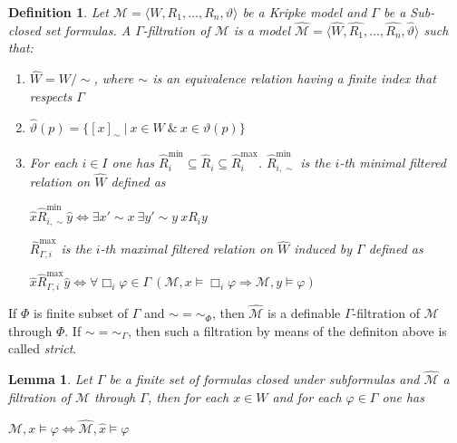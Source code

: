 \documentclass[a4paper]{article}
\theoremstyle{defin}
\newtheorem{defin}{Definition}
\theoremstyle{theorem}
\theoremstyle{prop}
\theoremstyle{lemma}
\newtheorem{lemma}{Lemma}
\theoremstyle{ex}
\theoremstyle{col}
\begin{document}
\begin{defin}
  Let $\mathcal{M} = \langle W, R_1, \dots, R_n, \vartheta \rangle$ be a Kripke model and $\Gamma$ be a Sub-closed set formulas. A $\Gamma$-filtration of $\mathcal{M}$ is a model
  $\widehat{\mathcal{M}} = \langle \widehat{W}, \widehat{R_1}, \dots, \widehat{R_n}, \widehat{\vartheta} \rangle$ such that:
  \begin{enumerate}
    \item $\widehat{W} = W / \sim$, where $\sim$ is an equivalence relation having a finite index that respects $\Gamma$
    \item $\widehat{\vartheta}(p) = \{ [x]_{\sim} \: | \: x \in W \: \& \: x \in \vartheta(p)\}$
    \item For each $i \in I$ one has $\widehat{R}_i^{\text{min}} \subseteq \widehat{R}_i \subseteq \widehat{R}_i^{\text{max}}$. $\widehat{R}_{i, \sim}^{\text{min}}$ is the $i$-th minimal filtered relation on $\widehat{W}$ defined as
    \begin{center}
      $\hat{x} \widehat{R}_{i, \sim}^{\text{min}} \hat{y} \Leftrightarrow \exists x' \sim x \: \exists y' \sim y \: x R_i y$
    \end{center}
    $\widehat{R}_{\Gamma,i}^{\text{max}}$ is the $i$-th maximal filtered relation on $\widehat{W}$ induced by $\Gamma$ defined as
    \begin{center}
      $\hat{x} \widehat{R}_{\Gamma,i}^{\text{max}} \hat{y} \Leftrightarrow \forall \Box_i \varphi \in \Gamma \: (\mathcal{M}, x \models \Box_i \varphi \Rightarrow \mathcal{M}, y \models \varphi)$
    \end{center}
  \end{enumerate}
\end{defin}

If $\Phi$ is finite subset of $\Gamma$ and $\sim = \sim_{\Phi}$, then $\widehat{\mathcal{M}}$ is a definable $\Gamma$-filtration of $\mathcal{M}$ through $\Phi$. If $\sim = \sim_{\Gamma}$, then such a filtration by means of the definiton above is called \emph{strict}.

\begin{lemma}
  Let $\Gamma$ be a finite set of formulas closed under subformulas and $\widehat{\mathcal{M}}$ a filtration of $\mathcal{M}$ through $\Gamma$, then for each $x \in W$ and for each $\varphi \in \Gamma$ one has
  \begin{center}
    $\mathcal{M}, x \models \varphi \Leftrightarrow \widehat{\mathcal{M}}, \hat{x} \models \varphi$
  \end{center}
\end{lemma}
\end{document}
